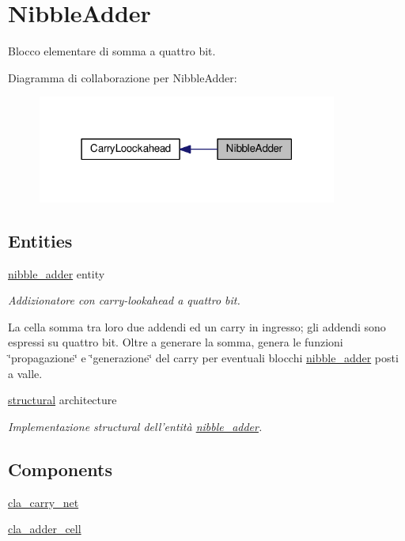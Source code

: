 \hypertarget{group___nibble_adder}{\section{Nibble\+Adder}
\label{group___nibble_adder}
}


Blocco elementare di somma a quattro bit.  


Diagramma di collaborazione per Nibble\+Adder\+:\nopagebreak
\begin{figure}[H]
\begin{center}
\leavevmode
\includegraphics[width=279pt]{group___nibble_adder}
\end{center}
\end{figure}
\subsection*{Entities}
\begin{DoxyCompactItemize}
\item 
\hyperlink{classnibble__adder}{nibble\+\_\+adder} entity
\begin{DoxyCompactList}\small\item\em Addizionatore con carry-\/lookahead a quattro bit.

La cella somma tra loro due addendi ed un carry in ingresso; gli addendi sono espressi su quattro bit. Oltre a generare la somma, genera le funzioni \char`\"{}propagazione\char`\"{} e \char`\"{}generazione\char`\"{} del carry per eventuali blocchi \hyperlink{classnibble__adder}{nibble\+\_\+adder} posti a valle. \end{DoxyCompactList}\item 
\hyperlink{classnibble__adder_1_1structural}{structural} architecture
\begin{DoxyCompactList}\small\item\em Implementazione structural dell'entità \hyperlink{classnibble__adder}{nibble\+\_\+adder}. \end{DoxyCompactList}\end{DoxyCompactItemize}
\subsection*{Components}
 \begin{DoxyCompactItemize}
\item 
\hyperlink{group___nibble_adder_ga12bdc5892f526938e1447d663d152df8}{cla\+\_\+carry\+\_\+net}  {\bfseries }  
\item 
\hyperlink{group___nibble_adder_ga4f13eb52457f650b1d2cd352d9cacca9}{cla\+\_\+adder\+\_\+cell}  {\bfseries }  
\end{DoxyCompactItemize}

